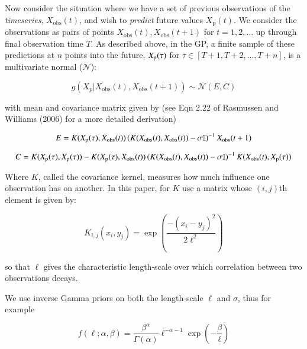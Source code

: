\documentclass[author-year, 12pt,review]{components/elsarticle} %
\begin{document}
Now consider the situation where we have a set of previous observations
of the \emph{timeseries}, $X_{\textrm{obs}}(t)$, and wish to
\emph{predict} future values $X_{\textrm{p}}(t)$. We consider the
observations as pairs of points
$X_{\textrm{obs}}(t), X_{\textrm{obs}}(t+1)$ for $t=1, 2, …$ up through
final observation time $T$. As described above, in the GP, a finite
sample of these predictions at $n$ points into the future,
$X_{\textrm p}(\tau)$ for $\tau \in [T+1, T+2, ..., T+n]$, is a
multivariate normal ($\mathcal{N}$):

\begin{equation}
g(X_p|X_{\textrm{obs}}(t), X_{\textrm{obs}}(t+1)) \sim \mathcal{N}(E,C)
\end{equation}

with mean and covariance matrix given by (see Eqn 2.22 of Rasmussen and
Williams (2006) for a more detailed derivation)

\begin{equation}
E = K(X_{\textrm p}(\tau), X_{\textrm{obs}}(t)) \left(K(X_{\textrm{obs}}(t),X_{\textrm{obs}}(t)) - \sigma \mathbb{I} \right)^{-1} X_{\textrm{obs}}(t+1)
\end{equation}

\begin{equation}
C = K(X_{\textrm p}(\tau), X_{\textrm p}(\tau)) - K(X_{\textrm p}(\tau), X_{\textrm{obs}}(t)) \left(K(X_{\textrm{obs}}(t),X_{\textrm{obs}}(t)) - \sigma \mathbb{I} \right)^{-1} K(X_{\textrm{obs}}(t), X_{\textrm p}(\tau))
\end{equation}

Where $K$, called the covariance kernel, measures how much influence one
observation has on another. In this paper, for $K$ use a matrix whose
$(i,j)$th element is given by:

\begin{equation}
K_{i,j}(x_i, y_j) = \exp\left( \frac{ -(x_i - y_j)^2}{2 \ell^2} \right)
\end{equation}

so that $\ell$ gives the characteristic length-scale over which
correlation between two observations decays.

We use inverse Gamma priors on both the length-scale $\ell$ and
$\sigma$, thus for example

\begin{equation}
f(\ell; \alpha, \beta) = \frac{\beta^\alpha}{\Gamma(\alpha)} \ell^{-\alpha - 1}\exp\left(-\frac{\beta}{\ell}\right)
\end{equation}
\end{document}
